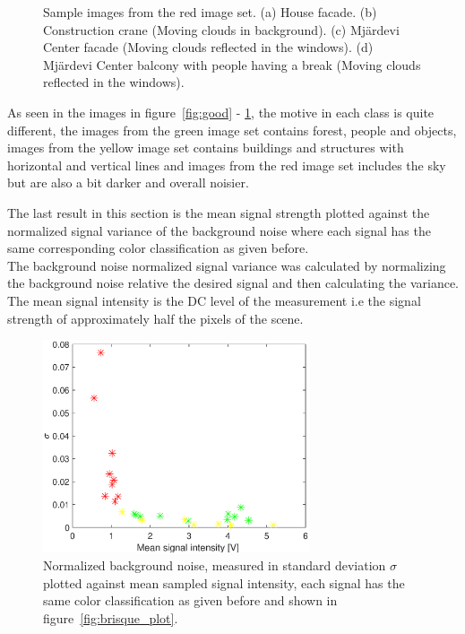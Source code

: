 \begin{figure}[H]
\begin{minipage}[t]{0.245\textwidth}
    \subcaption{}
    \label{fig:bad4}
\end{minipage}
    \caption{Sample images from the red image set.
    (a) House facade. (b) Construction crane (Moving clouds in background). (c) Mjärdevi Center facade (Moving clouds reflected in the windows). (d) Mjärdevi Center balcony with people having a break (Moving clouds reflected in the windows).}
    \label{fig:bad}
\end{figure}


As seen in the images in figure~\ref{fig:good} - \ref{fig:bad}, the motive in each class is quite different, the images from the green image set contains forest, people and objects, images from the yellow image set contains buildings and structures with horizontal and vertical lines and images from the red image set includes the sky but are also a bit darker and overall noisier. 


The last result in this section is the mean signal strength plotted against the normalized signal variance of the background noise where each signal has the same corresponding color classification as given before.\\[0.1in]

The background noise normalized signal variance was calculated by normalizing the background noise relative the desired signal and then calculating the variance. The mean signal intensity is the DC level of the measurement i.e the signal strength of approximately half the pixels of the scene. 

 

\begin{figure}[H]
    \centering
    \includegraphics[width=0.7\textwidth]{result/noise/meanV_sigma.eps}
    \caption{Normalized background noise, measured in standard deviation $\sigma$ plotted against mean sampled signal intensity, each signal has the same color classification as given before and shown in figure~\ref{fig:brisque_plot}.}
    \label{fig:snr_v_sigma}
\end{figure}

